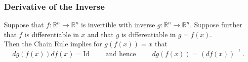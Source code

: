 



 



 




 \begin{frame}[fragile] \frametitle{Derivative of the Inverse}


  Suppose that
$f\colon \mathbb{R}^n \rightarrow \mathbb{R}^n$ is invertible with inverse
  $g\colon \mathbb{R}^n \rightarrow \mathbb{R}^n$. 
Suppose further that 
  $f$ is differentiable in  $x$ and that
 $g$ is differentiable  in $g=f(x)$.\\
Then the Chain Rule implies for 
  $g(f(x)) = x$ that
  \[ d g(f(x)) d f(x) = \text{Id}
  \qquad \text{ and hence } \qquad d g(f(x)) = (d f(x))^{-1}\,. \]


\end{frame}

